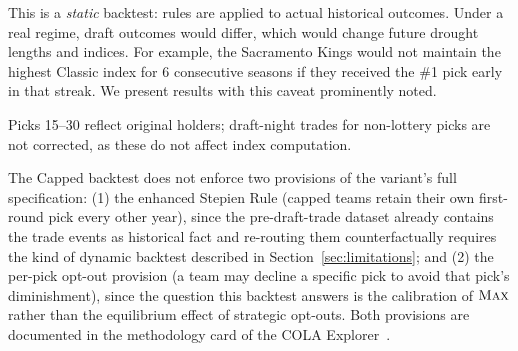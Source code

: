 This is a \emph{static} backtest: \cola{} rules are applied to actual historical outcomes. Under a real \cola{} regime, draft outcomes would differ, which would change future drought lengths and indices. For example, the Sacramento Kings would not maintain the highest Classic \cola{} index for 6 consecutive seasons if they received the \#1 pick early in that streak. We present results with this caveat prominently noted.

Picks 15--30 reflect original holders; draft-night trades for non-lottery picks are not corrected, as these do not affect \cola{} index computation.

The Capped \cola{} backtest does not enforce two provisions of the variant's full specification: (1) the enhanced Stepien Rule (capped teams retain their own first-round pick every other year), since the pre-draft-trade dataset already contains the trade events as historical fact and re-routing them counterfactually requires the kind of dynamic backtest described in Section~\ref{sec:limitations}; and (2) the per-pick opt-out provision (a team may decline a specific pick to avoid that pick's diminishment), since the question this backtest answers is the calibration of $\textup{\textsc{Max}}$ rather than the equilibrium effect of strategic opt-outs. Both provisions are documented in the methodology card of the COLA Explorer~\citep{rajan2026explorer}.
